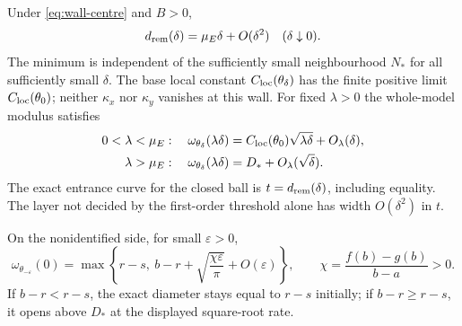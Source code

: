 \begin{theorem}\label{thm:wall}
Under \eqref{eq:wall-centre} and $B>0$,
\begin{equation}\label{eq:entrance-law}
 d_{\rm rem}(\delta)=\mu_E\delta+O(\delta^2)\quad(\delta\downarrow0).
\end{equation}
The minimum is independent of the sufficiently small neighbourhood
$N_*$ for all sufficiently small $\delta$. The base local constant
$C_{\mathrm{loc}}(\theta_\delta)$ has the finite positive limit
$C_{\mathrm{loc}}(\theta_0)$; neither $\kappa_x$ nor $\kappa_y$ vanishes at
this wall. For fixed $\lambda>0$ the whole-model modulus satisfies
\begin{align}
 0<\lambda<\mu_E:\quad
 \omega_{\theta_\delta}(\lambda\delta)
   &=C_{\mathrm{loc}}(\theta_0)\sqrt{\lambda\delta}+O_\lambda(\delta),
                                                        \label{eq:below-wall}\\
 \lambda>\mu_E:\quad
 \omega_{\theta_\delta}(\lambda\delta)
   &=D_*+O_\lambda(\sqrt\delta).                         \label{eq:above-wall}
\end{align}
The exact entrance curve for the closed ball is $t=d_{\rm rem}(\delta)$,
including equality. The layer not decided by the first-order threshold
alone has width $O(\delta^2)$ in $t$.

On the nonidentified side, for small $\varepsilon>0$,
\begin{equation}\label{eq:nonident-opening}
 \omega_{\theta_{-\varepsilon}}(0)
 =\max\left\{r-s,\ b-r+\sqrt{\frac{\chi\varepsilon}{\pi}}
                         +O(\varepsilon)\right\},\qquad
 \chi=\frac{f(b)-g(b)}{b-a}>0.
\end{equation}
If $b-r<r-s$, the exact diameter stays equal to $r-s$ initially;
if $b-r\ge r-s$, it opens above $D_*$ at the displayed square-root rate.
\end{theorem}
